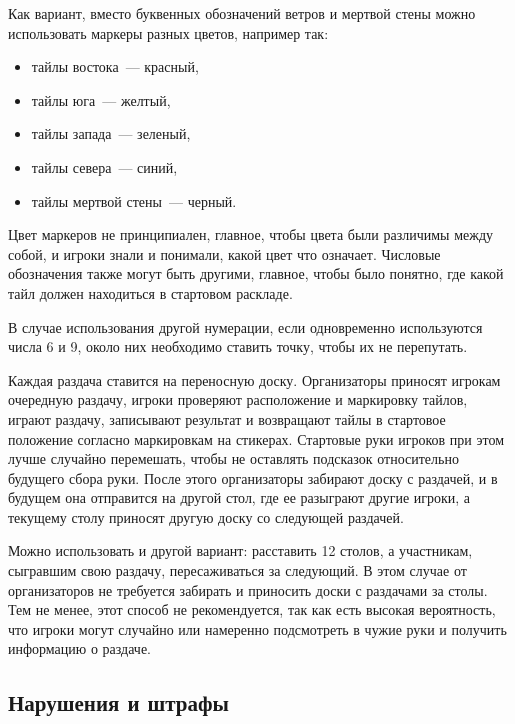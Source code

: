 \begin{additional}
Как вариант, вместо буквенных обозначений ветров и мертвой стены можно использовать маркеры разных цветов, например так:

\begin{itemize}
	\item тайлы востока~--- красный,
	\item тайлы юга~--- желтый,
	\item тайлы запада~--- зеленый,
	\item тайлы севера~--- синий,
	\item тайлы мертвой стены~--- черный.
\end{itemize}

Цвет маркеров не принципиален, главное, чтобы цвета были различимы между собой, и игроки знали и понимали, какой цвет что означает. Числовые обозначения также могут быть другими, главное, чтобы было понятно, где какой тайл должен находиться в стартовом раскладе.

В случае использования другой нумерации, если одновременно используются числа 6 и 9, около них необходимо ставить точку, чтобы их не перепутать.

\vspace{0.3cm}

Каждая раздача ставится на переносную доску. Организаторы приносят игрокам очередную раздачу, игроки проверяют расположение и маркировку тайлов, играют раздачу, записывают результат и возвращают тайлы в стартовое положение согласно маркировкам на стикерах. Стартовые руки игроков при этом лучше случайно перемешать, чтобы не оставлять подсказок относительно будущего сбора руки. После этого организаторы забирают доску с раздачей, и в будущем она отправится на другой стол, где ее разыграют другие игроки, а текущему столу приносят другую доску со следующей раздачей.

\vspace{0.3cm}

Можно использовать и другой вариант: расставить 12 столов, а участникам, сыгравшим свою раздачу, пересаживаться за следующий. В этом случае от организаторов не требуется забирать и приносить доски с раздачами за столы. Тем не менее, этот способ не рекомендуется, так как есть высокая вероятность, что игроки могут случайно или намеренно подсмотреть в чужие руки и получить информацию о раздаче.

\subsection{Нарушения и штрафы}


\end{additional}
